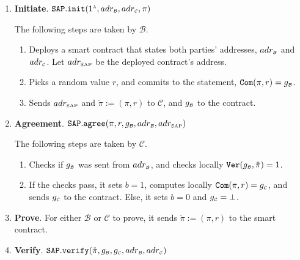 %
 \begin{enumerate}
 \item\textbf{Initiate}. $\mathtt{SAP.init}(1^{\scriptscriptstyle\lambda}, adr_{\scriptscriptstyle\mathcal{B}}, adr_{\scriptscriptstyle\mathcal{C}}, \pi )$ 

 The following steps are taken   by  $\mathcal B$.
 
  \begin{enumerate}
  \item\label{SAP::deploy-contract}  Deploys a smart contract that   states both parties'  addresses, $adr_{\scriptscriptstyle\mathcal{B}}$ and  $adr_{\scriptscriptstyle\mathcal{C}}$. Let $adr_{\scriptscriptstyle\text{SAP}}$ be the deployed contract's address. 

   \item  Picks a random value $r$, and commits to the statement, $\mathtt{Com}(\pi, r)=g_{\scriptscriptstyle \mathcal{B}}$.
   \item Sends $adr_{\scriptscriptstyle\text{SAP}}$ and $\ddot{\pi}:=(\pi, r)$  to  $\mathcal C$, and $g_{\scriptscriptstyle\mathcal B}$ to the contract. 
    \end{enumerate}
    \item\textbf{Agreement}. $\mathtt{SAP.agree}(\pi, r, g_{\scriptscriptstyle \mathcal{B}}, adr_{\scriptscriptstyle\mathcal{B}}, adr_{\scriptscriptstyle\text{SAP}})$

     The following steps are taken   by  $\mathcal C$.
     \begin{enumerate}
   \item Checks  if $g_{\scriptscriptstyle \mathcal{B}}$ was  sent  from $adr_{\scriptscriptstyle \mathcal{B}}$, and checks locally $\mathtt{Ver}(g_{\scriptscriptstyle\mathcal B}, \ddot{\pi})=1$.
   \item If the checks pass, it sets $b=1$,    computes locally $\mathtt{Com}(\pi, r)=g_{\scriptscriptstyle\mathcal C}$, and sends $g_{\scriptscriptstyle\mathcal C}$ to the contract. Else, it sets $b=0$ and $g_{\scriptscriptstyle\mathcal C}=\bot$.
    \end{enumerate}
     
     
     
   \item\textbf{Prove}. For either $\mathcal B$ or $\mathcal C$ to prove, it sends $\ddot{\pi}:=(\pi, r)$  to the smart contract. 
   
   
   
 \item\textbf{Verify}. $\mathtt{SAP.verify}(\ddot{\pi}, g_{\scriptscriptstyle\mathcal B},g_{\scriptscriptstyle\mathcal C}, adr_{\scriptscriptstyle\mathcal{B}}, adr_{\scriptscriptstyle\mathcal{C}})$
 

\end{enumerate}
